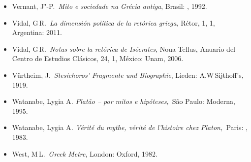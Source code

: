 \begin{itemize}
  Vernant, J"-P.~\emph{Mito e religião na Grécia antiga}, Campinas:
  Papirus, 1992.
\item
  Vernant, J"-P.~\emph{Mito e sociedade na Grécia antiga}, Brasil: ,
  1992.
\item
  Vidal, G\,R.~\emph{La dimensión política de la retórica griega},
  Rétor, 1, 1, Argentina: 2011.
\item
  Vidal, G\,R.~\emph{Notas sobre la retórica de Isócrates}, Noua Tellus,
  Anuario del Centro de Estudios Clásicos, 24, 1, México: Unam, 2006.
\item
  Vürtheim, J.~\emph{Stesichoros' Fragmente und Biographie}, Lieden:
  A.W\,Sijthoff's, 1919.
\item
  Watanabe, Lygia A\emph{. Platão -- por mitos e hipóteses,}~São Paulo:
  Moderna, 1995.
\item
  Watanabe, Lygia A\emph{. Vérité du mythe, vérité de l'histoire chez
  Platon,~}Paris: , 1983.
\item
  West, M\,L.~\emph{Greek Metre}, London: Oxford, 1982.
\end{itemize}
